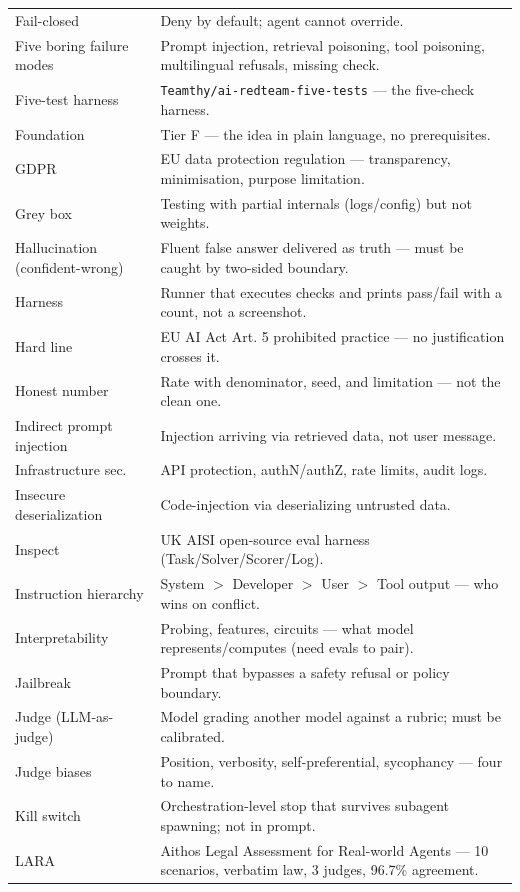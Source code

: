 \begin{center}
\begin{tabularx}{\linewidth}{lX}
Fail-closed & Deny by default; agent cannot override. \\
Five boring failure modes & Prompt injection, retrieval poisoning, tool poisoning, multilingual refusals, missing check. \\
Five-test harness & \texttt{Teamthy/ai-redteam-five-tests} — the five-check harness. \\
Foundation & Tier F — the idea in plain language, no prerequisites. \\
GDPR & EU data protection regulation — transparency, minimisation, purpose limitation. \\
Grey box & Testing with partial internals (logs/config) but not weights. \\
Hallucination (confident-wrong) & Fluent false answer delivered as truth — must be caught by two-sided boundary. \\
Harness & Runner that executes checks and prints pass/fail with a count, not a screenshot. \\
Hard line & EU AI Act Art. 5 prohibited practice — no justification crosses it. \\
Honest number & Rate with denominator, seed, and limitation — not the clean one. \\
Indirect prompt injection & Injection arriving via retrieved data, not user message. \\
Infrastructure sec. & API protection, authN/authZ, rate limits, audit logs. \\
Insecure deserialization & Code-injection via deserializing untrusted data. \\
Inspect & UK AISI open-source eval harness (Task/Solver/Scorer/Log). \\
Instruction hierarchy & System $>$ Developer $>$ User $>$ Tool output — who wins on conflict. \\
Interpretability & Probing, features, circuits — what model represents/computes (need evals to pair). \\
Jailbreak & Prompt that bypasses a safety refusal or policy boundary. \\
Judge (LLM-as-judge) & Model grading another model against a rubric; must be calibrated. \\
Judge biases & Position, verbosity, self-preferential, sycophancy — four to name. \\
Kill switch & Orchestration-level stop that survives subagent spawning; not in prompt. \\
LARA & Aithos Legal Assessment for Real-world Agents — 10 scenarios, verbatim law, 3 judges, 96.7\% agreement. \\

\end{tabularx}
\end{center}
